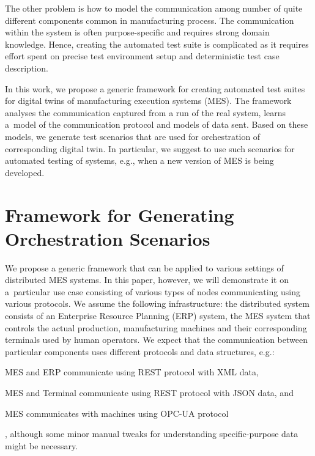 {The other problem is how to model the communication among number of quite
different components common in manufacturing process.
%
The communication within the system is often purpose-specific and requires
strong domain knowledge. 
%
Hence, creating the automated test suite is complicated as it requires effort
spent on precise test environment setup and deterministic test case
description.

In this work, we propose a generic framework for creating automated test suites
for digital twins of manufacturing execution systems (MES).  
%
The framework analyses the communication captured from a run of the real
system, learns a~model of the communication protocol and models of data sent.
%
Based on these models, we generate test scenarios that are used for
orchestration of corresponding digital twin.
%
In particular, we suggest to use such scenarios for automated testing of
systems, e.g., when a new version of MES is being developed.

\section{Framework for Generating Orchestration Scenarios}
\label{sec:overview}

We propose a generic framework that can be applied to various settings of
distributed MES systems. In this paper, however, we will demonstrate it on
a~particular use case consisting of various types of nodes communicating using
various protocols.
%
We assume the following infrastructure: the distributed system consists of an
Enterprise Resource Planning (ERP) system, the MES system that controls the
actual production, manufacturing machines and their corresponding terminals
used by human operators.  
%
We expect that the communication between particular components uses
different protocols and data structures, e.g.: \begin{inparaenum}[(1)]
%
\item MES and ERP communicate using REST protocol with XML data, 
%
\item MES and Terminal communicate using REST protocol with JSON data, and 
%
\item MES communicates with machines using OPC-UA protocol\end{inparaenum},
    although some minor manual tweaks for understanding specific-purpose data
    might be necessary.

}

